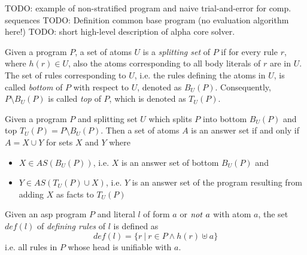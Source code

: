 TODO: example of non-stratified program and naive trial-and-error for comp. sequences
TODO: Definition common base program (no evaluation algorithm here!)
TODO: short high-level description of alpha core solver.

\begin{definition}
\label{def:prelims-asp-semantics-splitting-set}
Given a program $P$, a set of atoms $U$ is a \emph{splitting set} of $P$ if for every rule $r$, where $h(r) \in U$, also the atoms corresponding to all body literals of $r$ are in $U$. The set of rules corresponding to $U$, i.e. the rules defining the atoms in $U$, is called \emph{bottom} of $P$ with respect to $U$, denoted as $B_U(P)$. Consequently, $P \setminus B_U(P)$ is called \emph{top} of $P$, which is denoted as $T_U(P)$.\\
\end{definition}

\begin{theorem}
Given a program $P$ and splitting set $U$ which splits $P$ into bottom $B_U(P)$ and top $T_U(P) = P \setminus B_U(P)$. Then a set of atoms $A$ is an answer set if and only if $A = X \cup Y$ for sets $X$ and $Y$ where
\begin{itemize}
	\item $X \in AS(B_U(P))$, i.e. $X$ is an answer set of bottom $B_U(P)$ and
	\item $Y \in AS(T_U(P) \cup X)$, i.e. $Y$ is an answer set of the program resulting from adding $X$ as facts to $T_U(P)$ 
\end{itemize}	
\end{theorem}	


\begin{definition}
\label{def:prelims-asp-semantics}
Given an \gls{asp} program $P$ and literal $l$ of form $a$ or $\mathit{not}\ a$ with atom $a$, the set $\mathit{def}(l)$ of \emph{defining rules} of $l$ is defined as
\[
	\mathit{def}(l) = \{ r\ |\ r \in P \land h(r) \uplus a \}
\]
i.e. all rules in $P$ whose head is unifiable with $a$.
\end{definition}

